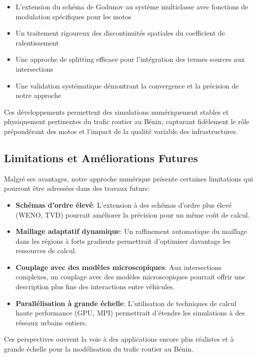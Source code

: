 \begin{itemize}
\item L'extension du schéma de Godunov au système multiclasse avec fonctions de modulation spécifiques pour les motos
\item Un traitement rigoureux des discontinuités spatiales du coefficient de ralentissement
\item Une approche de splitting efficace pour l'intégration des termes sources aux intersections
\item Une validation systématique démontrant la convergence et la précision de notre approche
\end{itemize}

Ces développements permettent des simulations numériquement stables et physiquement pertinentes du trafic routier au Bénin, capturant fidèlement le rôle prépondérant des motos et l'impact de la qualité variable des infrastructures.

\subsection{Limitations et Améliorations Futures}
\label{subsec:limitations}

Malgré ses avantages, notre approche numérique présente certaines limitations qui pourront être adressées dans des travaux futurs:

\begin{itemize}
\item \textbf{Schémas d'ordre élevé}: L'extension à des schémas d'ordre plus élevé (WENO, TVD) pourrait améliorer la précision pour un même coût de calcul.

\item \textbf{Maillage adaptatif dynamique}: Un raffinement automatique du maillage dans les régions à forts gradients permettrait d'optimiser davantage les ressources de calcul.

\item \textbf{Couplage avec des modèles microscopiques}: Aux intersections complexes, un couplage avec des modèles microscopiques pourrait offrir une description plus fine des interactions entre véhicules.

\item \textbf{Parallélisation à grande échelle}: L'utilisation de techniques de calcul haute performance (GPU, MPI) permettrait d'étendre les simulations à des réseaux urbains entiers.
\end{itemize}

Ces perspectives ouvrent la voie à des applications encore plus réalistes et à grande échelle pour la modélisation du trafic routier au Bénin.

